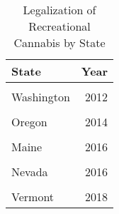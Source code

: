 \begin{table}[H]

\caption{\label{tab:tab:rollout}Legalization of Recreational Cannabis by State}
\centering
\begin{tabular}[t]{lr}
\toprule
State & Year\\
\midrule
\cellcolor{gray!6}{Colorado} & \cellcolor{gray!6}{2012}\\
Washington & 2012\\
\cellcolor{gray!6}{Alaska} & \cellcolor{gray!6}{2014}\\
Oregon & 2014\\
\cellcolor{gray!6}{California} & \cellcolor{gray!6}{2016}\\
\addlinespace
Maine & 2016\\
\cellcolor{gray!6}{Massachusetts} & \cellcolor{gray!6}{2016}\\
Nevada & 2016\\
\cellcolor{gray!6}{Michigan} & \cellcolor{gray!6}{2018}\\
Vermont & 2018\\
\bottomrule
\end{tabular}
\end{table}
